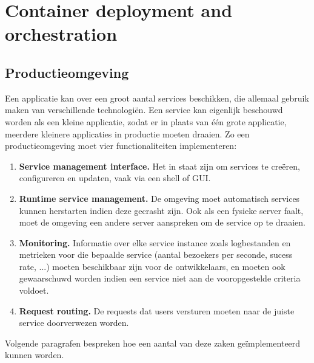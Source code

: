 \part{Container deployment and orchestration}
	\chapter{Productieomgeving}
	Een applicatie kan over een groot aantal services beschikken, die allemaal gebruik maken van verschillende technologiën. Een service kan eigenlijk beschouwd worden als een kleine applicatie, zodat er in plaats van één grote applicatie, meerdere kleinere applicaties in productie moeten draaien. Zo een productieomgeving moet vier functionaliteiten implementeren:
	\begin{enumerate}
		\item[\info]\textbf{Service management interface.} Het in staat zijn om services te creëren, configureren en updaten, vaak via een shell of GUI.
		\item[\info]\textbf{Runtime service management.} De omgeving moet automatisch services kunnen herstarten indien deze gecrasht zijn. Ook als een fysieke server faalt, moet de omgeving een andere server aanspreken om de service op te draaien.
		\item[\info]\textbf{Monitoring.} Informatie over elke service instance zoals logbestanden en metrieken voor die bepaalde service (aantal bezoekers per seconde, sucess rate, ...) moeten beschikbaar zijn voor de ontwikkelaars, en moeten ook gewaarschuwd worden indien een service niet aan de vooropgestelde criteria voldoet.  
		\item[\info]\textbf{Request routing.} De requests dat users versturen moeten naar de juiste service doorverwezen worden.
	\end{enumerate}

	Volgende paragrafen bespreken hoe een aantal van deze zaken geïmplementeerd kunnen worden.


